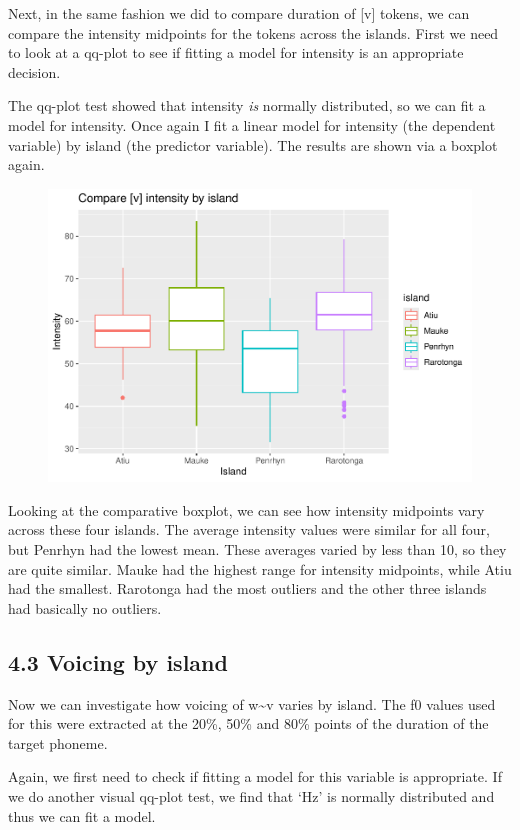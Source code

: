 \documentclass[
  ,man,floatsintext]{apa6}
\begin{document}
Next, in the same fashion we did to compare duration of {[}v{]} tokens, we can compare the intensity midpoints for the tokens across the islands. First we need to look at a qq-plot to see if fitting a model for intensity is an appropriate decision.

The qq-plot test showed that intensity \emph{is} normally distributed, so we can fit a model for intensity. Once again I fit a linear model for intensity (the dependent variable) by island (the predictor variable). The results are shown via a boxplot again.

\begin{figure}
\includegraphics[width=0.75\linewidth]{cim_w_v_manuscript_files/figure-latex/print-mod2-1} \caption{ }\label{fig:print-mod2}
\end{figure}

Looking at the comparative boxplot, we can see how intensity midpoints vary across these four islands. The average intensity values were similar for all four, but Penrhyn had the lowest mean. These averages varied by less than 10, so they are quite similar. Mauke had the highest range for intensity midpoints, while Atiu had the smallest. Rarotonga had the most outliers and the other three islands had basically no outliers.

\subsection{4.3 Voicing by island}\label{voicing-by-island}

Now we can investigate how voicing of w\textasciitilde v varies by island. The f0 values used for this were extracted at the 20\%, 50\% and 80\% points of the duration of the target phoneme.

Again, we first need to check if fitting a model for this variable is appropriate. If we do another visual qq-plot test, we find that `Hz' is normally distributed and thus we can fit a model.
\end{document}
